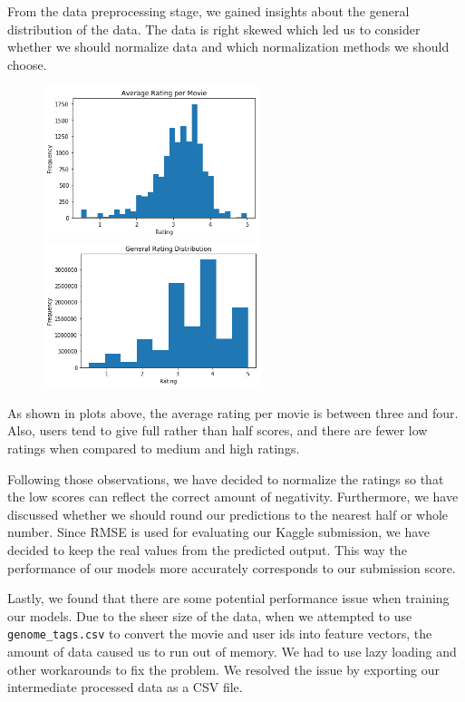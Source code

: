 \documentclass[11pt]{article}
\begin{document}
From the data preprocessing stage, we gained insights about the general distribution of the data. The data is right skewed
which led us to consider whether we should normalize data and which normalization methods we should choose.

\begin{figure}[H]
    \begin{center}
        \includegraphics[width=2.5in]{AverageRatingByMovie.png}
        \includegraphics[width=2.5in]{RatingHistogram.png}
    \end{center}
\end{figure}

As shown in plots above, the average rating per movie is between three and four. Also, users tend to give
full rather than half scores, and there are fewer low ratings when compared to medium and high ratings.

Following those observations, we have decided to normalize the ratings so that the low scores can reflect the correct amount of
negativity. Furthermore, we have discussed whether we should round our predictions to the nearest half
or whole number. Since RMSE is used for evaluating our Kaggle submission, we have decided to keep the real values from the
predicted output. This way the performance of our models more accurately corresponds to our submission score.

Lastly, we found that there are some potential performance issue when training our models. Due to the sheer size of the data,
when we attempted to use \texttt{genome\_tags.csv} to convert the movie and user ids into feature vectors, the amount of data
caused us to run out of memory. We had to use lazy loading and other workarounds to fix the problem. We resolved the issue
by exporting our intermediate processed data as a CSV file.
\end{document}
